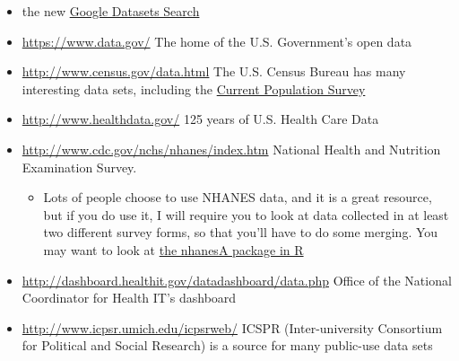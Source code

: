 \documentclass[]{book}
\providecommand{\tightlist}{%
  \setlength{\itemsep}{0pt}\setlength{\parskip}{0pt}}
\theoremstyle{definition}
\theoremstyle{definition}
\theoremstyle{definition}
\theoremstyle{remark}
\begin{document}
\begin{itemize}
\tightlist
\item
  the new \href{https://toolbox.google.com/datasetsearch}{Google
  Datasets Search}
\item
  \url{https://www.data.gov/} The home of the U.S. Government's open
  data
\item
  \url{http://www.census.gov/data.html} The U.S. Census Bureau has many
  interesting data sets, including the
  \href{http://www.census.gov/programs-surveys/cps.html}{Current
  Population Survey}
\item
  \url{http://www.healthdata.gov/} 125 years of U.S. Health Care Data
\item
  \url{http://www.cdc.gov/nchs/nhanes/index.htm} National Health and
  Nutrition Examination Survey.

  \begin{itemize}
  \tightlist
  \item
    Lots of people choose to use NHANES data, and it is a great
    resource, but if you do use it, I will require you to look at data
    collected in at least two different survey forms, so that you'll
    have to do some merging. You may want to look at
    \href{https://cran.r-project.org/web/packages/nhanesA/vignettes/Introducing_nhanesA.html}{the
    nhanesA package in R}
  \end{itemize}
\item
  \url{http://dashboard.healthit.gov/datadashboard/data.php} Office of
  the National Coordinator for Health IT's dashboard
\item
  \url{http://www.icpsr.umich.edu/icpsrweb/} ICSPR (Inter-university
  Consortium for Political and Social Research) is a source for many
  public-use data sets


\end{itemize}
\end{document}

